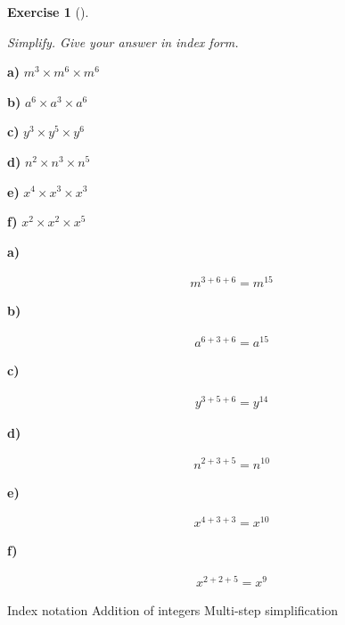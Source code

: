 \documentclass[
  letterpaper,
  DIV=11,
  numbers=noendperiod]{scrreprt}
\theoremstyle{definition}
\newtheorem{exercise}{Exercise}[chapter]
\theoremstyle{remark}
\begin{document}
\begin{exercise}[]\protect\hypertarget{exr-u2-2}{}\label{exr-u2-2}

\emph{Simplify. Give your answer in index form.}

\textbf{a)} \(\displaystyle m^{3} \times m^{6} \times m^{6}\)

\textbf{b)} \(\displaystyle a^{6} \times a^{3} \times a^{6}\)

\textbf{c)} \(\displaystyle y^{3} \times y^{5} \times y^{6}\)

\textbf{d)} \(\displaystyle n^{2} \times n^{3} \times n^{5}\)

\textbf{e)} \(\displaystyle x^{4} \times x^{3} \times x^{3}\)

\textbf{f)} \(\displaystyle x^{2} \times x^{2} \times x^{5}\)

\begin{tcolorbox}[enhanced jigsaw, opacitybacktitle=0.6, coltitle=black, arc=.35mm, colframe=quarto-callout-tip-color-frame, colback=white, bottomrule=.15mm, left=2mm, colbacktitle=quarto-callout-tip-color!10!white, titlerule=0mm, opacityback=0, title=\textcolor{quarto-callout-tip-color}{\faLightbulb}\hspace{0.5em}{🔍 View Solutions}, leftrule=.75mm, breakable, rightrule=.15mm, bottomtitle=1mm, toptitle=1mm, toprule=.15mm]

\textbf{a)}

\[
\begin{aligned}
m^{3+6+6} = m^{15}
\end{aligned}
\]

\textbf{b)}

\[
\begin{aligned}
a^{6+3+6} = a^{15}
\end{aligned}
\]

\textbf{c)}

\[
\begin{aligned}
y^{3+5+6} = y^{14}
\end{aligned}
\]

\textbf{d)}

\[
\begin{aligned}
n^{2+3+5} = n^{10}
\end{aligned}
\]

\textbf{e)}

\[
\begin{aligned}
x^{4+3+3} = x^{10}
\end{aligned}
\]

\textbf{f)}

\[
\begin{aligned}
x^{2+2+5} = x^{9}
\end{aligned}
\]

\end{tcolorbox}

{Index notation} {Addition of integers} {Multi-step simplification}

\end{exercise}
\end{document}
